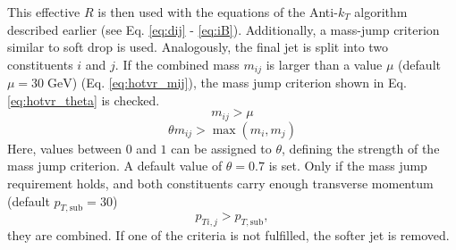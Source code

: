 	\noindent This effective $R$ is then used with the equations of the Anti-$k_T$ algorithm described earlier (see Eq. \ref{eq:dij} - \ref{eq:iB}). Additionally, a mass-jump criterion similar to soft drop is used. Analogously, the final jet is split into two constituents $i$ and $j$. If the combined mass $m_{ij}$ is larger than a value $\mu$ (default $\mu = 30\;\text{GeV}$) (Eq. \ref{eq:hotvr_mij}), the mass jump criterion shown in Eq. \ref{eq:hotvr_theta} is checked.
	\begin{equation}
	m_{ij} > \mu
	\label{eq:hotvr_mij}
	\end{equation}
	\begin{equation}
	\theta m_{ij} > \max(m_i, m_j)
	\label{eq:hotvr_theta}
	\end{equation}
	Here, values between $0$ and $1$ can be assigned to $\theta$, defining the strength of the mass jump criterion. A default value of $\theta =0.7$ is set. Only if the mass jump requirement holds, and both constituents carry enough transverse momentum (default $p_{T,\text{sub}} = 30$)
	\begin{equation}
	p_{Ti,j} > p_{T,\text{sub}},
	\label{eq:hotvr_pt}
	\end{equation}	
	they are combined. If one of the criteria is not fulfilled, the softer jet is removed.
	
